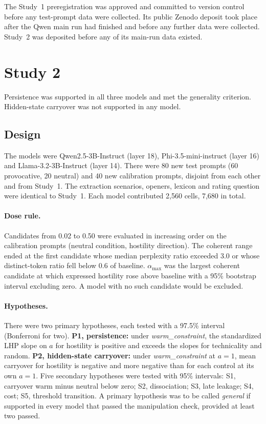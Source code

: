 \documentclass[11pt]{article}
\newcommand{\amax}{\alpha_{\max}}
\newcommand{\warm}{\textit{warm\_constraint}}
\begin{document}
The Study~1 preregistration was approved and committed to version control before any test-prompt data were collected. Its public Zenodo deposit took place after the Qwen main run had finished and before any further data were collected. Study~2 was deposited before any of its main-run data existed.

\section{Study 2}\label{sec:study2}

Persistence was supported in all three models and met the generality criterion. Hidden-state carryover was not supported in any model.

\subsection{Design}

The models were Qwen2.5-3B-Instruct (layer 18), Phi-3.5-mini-instruct (layer 16) and Llama-3.2-3B-Instruct (layer 14). There were 80 new test prompts (60 provocative, 20 neutral) and 40 new calibration prompts, disjoint from each other and from Study~1. The extraction scenarios, openers, lexicon and rating question were identical to Study~1. Each model contributed 2{,}560 cells, 7{,}680 in total.

\paragraph{Dose rule.} Candidates from 0.02 to 0.50 were evaluated in increasing order on the calibration prompts (neutral condition, hostility direction). The coherent range ended at the first candidate whose median perplexity ratio exceeded 3.0 or whose distinct-token ratio fell below 0.6 of baseline. $\amax$ was the largest coherent candidate at which expressed hostility rose above baseline with a 95\% bootstrap interval excluding zero. A model with no such candidate would be excluded.

\paragraph{Hypotheses.} There were two primary hypotheses, each tested with a 97.5\% interval (Bonferroni for two). \textbf{P1, persistence:} under \warm{}, the standardized LHP slope on $a$ for hostility is positive and exceeds the slopes for technicality and random. \textbf{P2, hidden-state carryover:} under \warm{} at $a=1$, mean carryover for hostility is negative and more negative than for each control at its own $a=1$. Five secondary hypotheses were tested with 95\% intervals: S1, carryover warm minus neutral below zero; S2, dissociation; S3, late leakage; S4, cost; S5, threshold transition. A primary hypothesis was to be called \emph{general} if supported in every model that passed the manipulation check, provided at least two passed.
\end{document}
